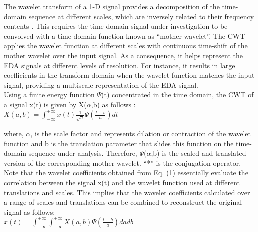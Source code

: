 The wavelet transform of a 1-D signal provides a decomposition of the time-domain 
sequence at different scales, which are inversely related to their frequency contents\cite{SignalDecomp1989, ContinuWavelet2009} . 
This requires the time-domain signal under 
investigation to be convolved with a time-domain function known as “mother wavelet”. 
The CWT applies the wavelet function at different scales with continuous time-shift 
of the mother wavelet over the input signal. As a consequence, it helps represent 
the EDA signals at different levels of resolution. For instance, it results in large 
coefficients in the transform domain when the wavelet function matches the input 
signal, providing a multiscale representation of the EDA signal.\\

Using a finite energy function $\Psi$(t) concentrated in the time domain, the CWT of 
a signal x(t) is given by X($\alpha$,b) as follows \cite{WaveletFilter1992}:\\

$X(a,b) = \int_{-\infty}^{+\infty}x(t)\frac{1}{\sqrt{a}} \Psi (\frac{t-b}{a}) dt$\newline

where, $\alpha$, is the scale factor and represents dilation or contraction of the wavelet 
function and b is the translation parameter that slides this function on the 
time-domain sequence under analysis. Therefore, $\Psi$($\alpha$,b) is the scaled and translated 
version of the corresponding mother wavelet. “*” is the conjugation operator.\\

Note that the wavelet coefficients obtained from Eq. (1) essentially evaluate the 
correlation between the signal x(t) and the wavelet function used at different 
translations and scales. This implies that the wavelet coefficients calculated 
over a range of scales and translations can be combined to reconstruct the original 
signal as follows:\\

$x(t) = \int_{-\infty}^{+\infty} \int_{-\infty}^{+\infty} X(a,b) \Psi (\frac{t-b}{a}) dadb$\newline

